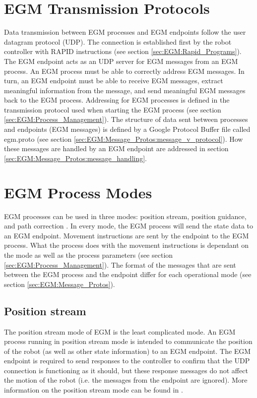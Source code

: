 \documentclass{cslthse-msc}
\begin{document}
\section{EGM Transmission Protocols}
\label{sec:EGM:Trans_Protos}
Data transmission between EGM processes and EGM endpoints follow the user datagram protocol (UDP). The connection is established first by the robot controller with RAPID instructions (see section \ref{sec:EGM:Rapid_Programs}). The EGM endpoint acts as an UDP server for EGM messages from an EGM process. An EGM process must be able to correctly address EGM messages. In turn, an EGM endpoint must be able to receive EGM messages, extract meaningful information from the message, and send meaningful EGM messages back to the EGM process. Addressing for EGM processes is defined in the transmission protocol used when starting the EGM process (see section \ref{sec:EGM:Process_Management}). The structure of data sent between processes and endpoints (EGM messages) is defined by a Google Protocol Buffer file called egm.proto (see section \ref{sec:EGM:Message_Protos:message_v_protocol}). How these messages are handled by an EGM endpoint are addressed in section \ref{sec:EGM:Message_Protos:message_handling}. 


\section{EGM Process Modes}
\label{sec:EGM:Modes}
EGM processes can be used in three modes: position stream, position guidance, and path correction \cite[Sec. 9.3.1.1]{ABB:controller_software}. In every mode, the EGM process will send the state data to an EGM endpoint. Movement instructions are sent by the endpoint to the EGM process. What the process does with the movement instructions is dependant on the mode as well as the process parameters (see section \ref{sec:EGM:Process_Management}). The format of the messages that are sent between the EGM process and the endpoint differ for each operational mode (see section \ref{sec:EGM:Message_Protos}). 

\subsection{Position stream}
\label{sec:EGM:Modes:stream}
The position stream mode of EGM is the least complicated mode. An EGM process running in position stream mode is intended to communicate the position of the robot (as well as other state information) to an EGM endpoint. The EGM endpoint is required to send responses to the controller to confirm that the UDP connection is functioning as it should, but these response messages do not affect the motion of the robot (i.e. the messages from the endpoint are ignored). More information on the position stream mode can be found in \cite[Sec. 9.3.1.2]{ABB:controller_software}.
\end{document}
